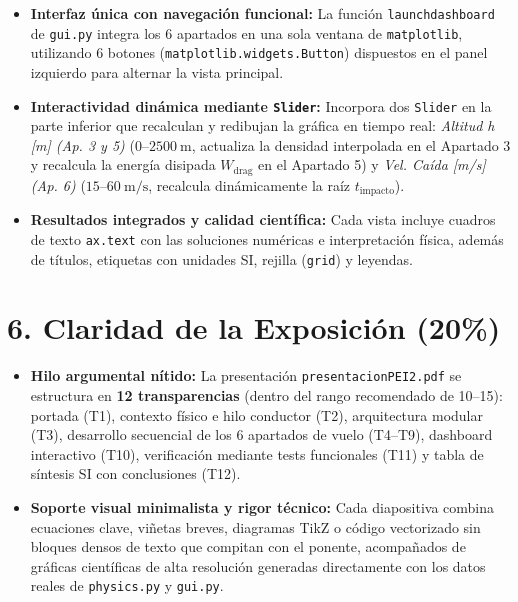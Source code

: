 \documentclass[10pt, a4paper]{article}
\renewcommand{\_}{\textunderscore\allowbreak}
\begin{document}
\begin{itemize}
    \item \textbf{Interfaz única con navegación funcional:} La función \texttt{launch\_dashboard} de \texttt{gui.py} integra los 6 apartados en una sola ventana de \texttt{matplotlib}, utilizando 6 botones (\texttt{matplotlib.widgets.Button}) dispuestos en el panel izquierdo para alternar la vista principal.
    \item \textbf{Interactividad dinámica mediante \texttt{Slider}:} Incorpora dos \texttt{Slider} en la parte inferior que recalculan y redibujan la gráfica en tiempo real: \emph{Altitud h [m] (Ap. 3 y 5)} ($0$--$2500\ \mathrm{m}$, actualiza la densidad interpolada en el Apartado 3 y recalcula la energía disipada $W_{\text{drag}}$ en el Apartado 5) y \emph{Vel. Caída [m/s] (Ap. 6)} ($15$--$60\ \mathrm{m/s}$, recalcula dinámicamente la raíz $t_{\text{impacto}}$).
    \item \textbf{Resultados integrados y calidad científica:} Cada vista incluye cuadros de texto \texttt{ax.text} con las soluciones numéricas e interpretación física, además de títulos, etiquetas con unidades SI, rejilla (\texttt{grid}) y leyendas.
\end{itemize}

\section*{6. Claridad de la Exposición (20\%)}

\begin{itemize}
    \item \textbf{Hilo argumental nítido:} La presentación \texttt{presentacion\_PEI2.pdf} se estructura en \textbf{12 transparencias} (dentro del rango recomendado de 10--15): portada (T1), contexto físico e hilo conductor (T2), arquitectura modular (T3), desarrollo secuencial de los 6 apartados de vuelo (T4--T9), dashboard interactivo (T10), verificación mediante tests funcionales (T11) y tabla de síntesis SI con conclusiones (T12).
    \item \textbf{Soporte visual minimalista y rigor técnico:} Cada diapositiva combina ecuaciones clave, viñetas breves, diagramas TikZ o código vectorizado sin bloques densos de texto que compitan con el ponente, acompañados de gráficas científicas de alta resolución generadas directamente con los datos reales de \texttt{physics.py} y \texttt{gui.py}.
\end{itemize}
\end{document}

